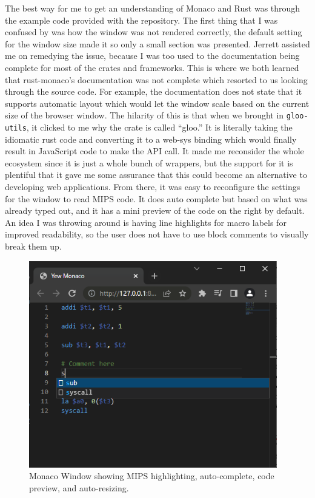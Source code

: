 \documentclass[
    paper=letter,
    parskip=half,
    fontsize=12pt,
    titlepage=firstiscover,
    toc=bibliography,
    numbers=endperiod
]{scrartcl}
\begin{document}
The best way for me to get an understanding of Monaco and Rust was
through the example code provided with the repository. The first thing
that I was confused by was how the window was not rendered correctly,
the default setting for the window size made it so only a small section
was presented. Jerrett assisted me on remedying the issue, because I was
too used to the documentation being complete for most of the crates and
frameworks. This is where we both learned that rust-monaco's
documentation was not complete which resorted to us looking through the
source code. For example, the documentation does not state that it
supports automatic layout which would let the window scale based on the
current size of the browser window. The hilarity of this is that when we
brought in \texttt{gloo-utils}, it clicked to me why the crate is called
``gloo.'' It is literally taking the idiomatic rust code and converting
it to a web-sys binding which would finally result in JavaScript code to
make the API call. It made me reconsider the whole ecosystem since it is
just a whole bunch of wrappers, but the support for it is plentiful that
it gave me some assurance that this could become an alternative to
developing web applications. From there, it was easy to reconfigure the
settings for the window to read MIPS code. It does auto complete but
based on what was already typed out, and it has a mini preview of the
code on the right by default. An idea I was throwing around is having
line highlights for macro labels for improved readability, so the user
does not have to use block comments to visually break them up.

\begin{figure}[H]
    \includegraphics[height=9cm]{jimmie-monaco-prototype}
    \caption{Monaco Window showing MIPS highlighting, auto-complete, code preview, and auto-resizing.}
\end{figure}
\end{document}
